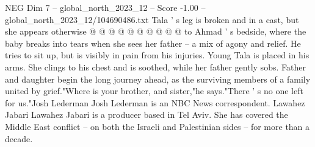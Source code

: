 \begin{textsample}{NEG Dim 7 – global\_north\_2023\_12 – Score -1.00 – global\_north\_2023\_12/104690486.txt}
Tala ' s leg is broken and in a cast, but she appears otherwise @ @ @ @ @ @ @ @ @ @ to Ahmad ' s bedside, where the baby breaks into tears when she sees her father -- a mix of agony and relief.
He tries to sit up, but is visibly in pain from his injuries.
Young Tala is placed in his arms.
She clings to his chest and is soothed, while her father gently sobs.
Father and daughter begin the long journey ahead, as the surviving members of a family united by grief."Where is your brother, and sister,"he says."There ' s no one left for us."Josh Lederman Josh Lederman is an NBC News correspondent.
Lawahez Jabari Lawahez Jabari is a producer based in Tel Aviv.
She has covered the Middle East conflict -- on both the Israeli and Palestinian sides -- for more than a decade.

\end{textsample}
